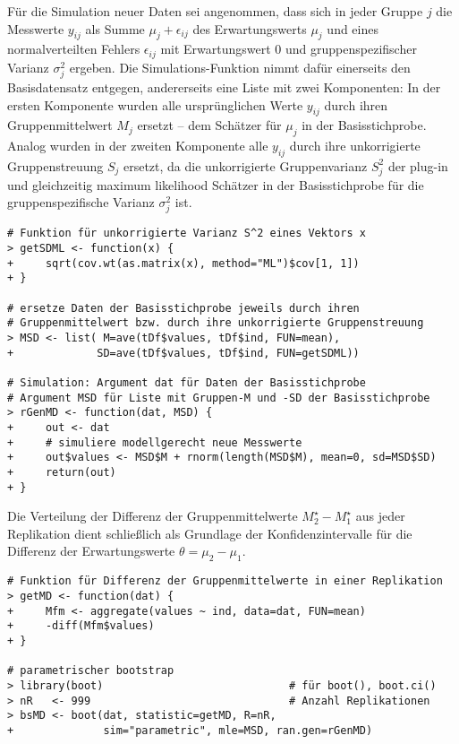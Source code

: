 Für die Simulation neuer Daten sei angenommen, dass sich in jeder Gruppe $j$ die Messwerte $y_{ij}$ als Summe $\mu_{j} + \epsilon_{ij}$ des Erwartungswerts $\mu_{j}$ und eines normalverteilten Fehlers $\epsilon_{ij}$ mit Erwartungswert $0$ und gruppenspezifischer Varianz $\sigma_{j}^{2}$ ergeben. Die Simulations-Funktion nimmt dafür einerseits den Basisdatensatz entgegen, andererseits eine Liste mit zwei Komponenten: In der ersten Komponente wurden alle ursprünglichen Werte $y_{ij}$ durch ihren Gruppenmittelwert $M_{j}$ ersetzt -- dem Schätzer für $\mu_{j}$ in der Basisstichprobe. Analog wurden in der zweiten Komponente alle $y_{ij}$ durch ihre unkorrigierte Gruppenstreuung $S_{j}$ ersetzt, da die unkorrigierte Gruppenvarianz $S_{j}^{2}$ der plug-in und gleichzeitig maximum likelihood Schätzer in der Basisstichprobe für die gruppenspezifische Varianz $\sigma_{j}^{2}$ ist.
\begin{lstlisting}
# Funktion für unkorrigierte Varianz S^2 eines Vektors x
> getSDML <- function(x) {
+     sqrt(cov.wt(as.matrix(x), method="ML")$cov[1, 1])
+ }

# ersetze Daten der Basisstichprobe jeweils durch ihren
# Gruppenmittelwert bzw. durch ihre unkorrigierte Gruppenstreuung
> MSD <- list( M=ave(tDf$values, tDf$ind, FUN=mean),
+             SD=ave(tDf$values, tDf$ind, FUN=getSDML))

# Simulation: Argument dat für Daten der Basisstichprobe
# Argument MSD für Liste mit Gruppen-M und -SD der Basisstichprobe
> rGenMD <- function(dat, MSD) {
+     out <- dat
+     # simuliere modellgerecht neue Messwerte
+     out$values <- MSD$M + rnorm(length(MSD$M), mean=0, sd=MSD$SD)
+     return(out)
+ }
\end{lstlisting}

Die Verteilung der Differenz der Gruppenmittelwerte $M_{2}^{\star}-M_{1}^{\star}$ aus jeder Replikation dient schließlich als Grundlage der Konfidenzintervalle für die Differenz der Erwartungswerte $\theta = \mu_{2}-\mu_{1}$.
\begin{lstlisting}
# Funktion für Differenz der Gruppenmittelwerte in einer Replikation
> getMD <- function(dat) {
+     Mfm <- aggregate(values ~ ind, data=dat, FUN=mean)
+     -diff(Mfm$values)
+ }

# parametrischer bootstrap
> library(boot)                             # für boot(), boot.ci()
> nR   <- 999                               # Anzahl Replikationen
> bsMD <- boot(dat, statistic=getMD, R=nR,
+              sim="parametric", mle=MSD, ran.gen=rGenMD)
\end{lstlisting}

